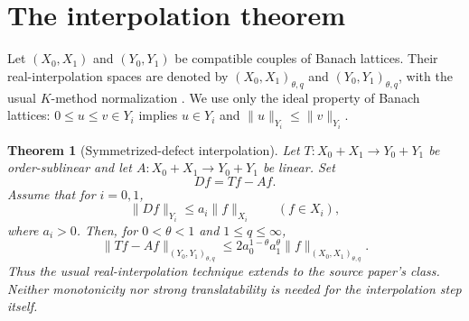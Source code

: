 \documentclass[11pt]{article}
\newtheorem{theorem}{Theorem}
\newcommand{\Dop}{D}
\begin{document}
\section{The interpolation theorem}

Let $(X_0,X_1)$ and $(Y_0,Y_1)$ be compatible couples of Banach lattices.
Their real-interpolation spaces are denoted by
$(X_0,X_1)_{\theta,q}$ and $(Y_0,Y_1)_{\theta,q}$, with the usual
$K$-method normalization \cite{BL}. We use only the ideal property of
Banach lattices: $0\leq u\leq v\in Y_i$ implies
$u\in Y_i$ and $\|u\|_{Y_i}\leq\|v\|_{Y_i}$.

\begin{theorem}[Symmetrized-defect interpolation]\label{thm:main}
Let $T:X_0+X_1\to Y_0+Y_1$ be order-sublinear and let
$A:X_0+X_1\to Y_0+Y_1$ be linear. Set
\[
 \Dop f=Tf-Af.
\]
Assume that for $i=0,1$,
\begin{equation}\label{eq:endpoint}
 \|\Dop f\|_{Y_i}\leq a_i\|f\|_{X_i}\qquad(f\in X_i),
\end{equation}
where $a_i>0$. Then, for $0<\theta<1$ and $1\leq q\leq\infty$,
\begin{equation}\label{eq:interp}
 \|Tf-Af\|_{(Y_0,Y_1)_{\theta,q}}
 \leq
 2a_0^{1-\theta}a_1^{\theta}
 \|f\|_{(X_0,X_1)_{\theta,q}}.
\end{equation}
Thus the usual real-interpolation technique extends to the source paper's
class. Neither monotonicity nor strong translatability is needed for the
interpolation step itself.
\end{theorem}
\end{document}
